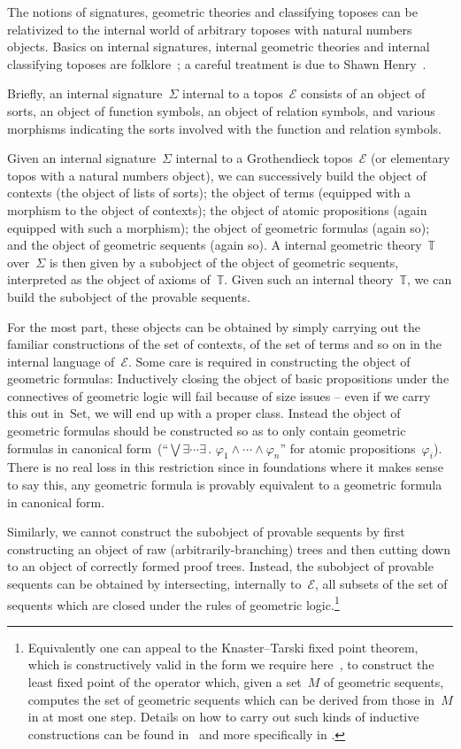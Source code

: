 \documentclass[oneside,reqno]{amsart}
\theoremstyle{definition}
\theoremstyle{plain}
\theoremstyle{remark}
\newcommand{\E}{\mathcal{E}}
\newcommand{\TT}{\mathbb{T}}
\newcommand{\Set}{\mathrm{Set}}
\renewcommand{\_}{\mathpunct{.}\,}
\newcommand{\?}{\,{:}\,}
\begin{document}
The notions of signatures, geometric theories and classifying toposes can be
relativized to the internal world of arbitrary toposes with natural numbers
objects. Basics on internal signatures, internal geometric
theories and internal classifying toposes are
folklore~\cite[p.~334]{wraith:intuitionistic-algebra}; a careful treatment is
due to Shawn Henry~\cite{henry:phd}.

Briefly, an internal signature~$\Sigma$ internal to a topos~$\E$ consists of an
object of sorts, an object of function symbols, an object of relation symbols,
and various morphisms indicating the sorts involved with the function and
relation symbols.

Given an internal signature~$\Sigma$ internal to a Grothendieck topos~$\E$ (or
elementary topos with a natural numbers object), we can successively build the
object of contexts (the object of lists of sorts); the object of terms
(equipped with a morphism to the object of contexts); the object of atomic
propositions (again equipped with such a morphism); the object of geometric
formulas (again so); and the object of geometric sequents (again so). A internal
geometric theory~$\TT$ over~$\Sigma$ is then given by a subobject of the object
of geometric sequents, interpreted as the object of axioms of~$\TT$.
Given such an internal theory~$\TT$, we can build the subobject of the provable
sequents.

For the most part, these objects can be obtained by simply carrying out the
familiar constructions of the set of contexts, of the set of terms and so on in
the internal language of~$\E$. Some care is required in constructing the
object of geometric formulas: Inductively closing the object of basic
propositions under the connectives of geometric logic will fail because of size
issues -- even if we carry this out in~$\Set$, we will end up with a proper
class. Instead the object of geometric formulas should be constructed so as to
only contain geometric formulas in canonical form~(``$\bigvee \exists \cdots
\exists\_ \varphi_1 \wedge \cdots \wedge \varphi_n$'' for atomic
propositions~$\varphi_i$). There is no real loss in this restriction since in
foundations where it makes sense to say this, any geometric formula is provably
equivalent to a geometric formula in canonical form.

Similarly, we cannot construct the subobject of provable sequents by first
constructing an object of raw (arbitrarily-branching) trees and then cutting
down to an object of correctly formed proof trees. Instead, the subobject of
provable sequents can be obtained by intersecting, internally to~$\E$, all
subsets of the set of sequents which are closed under the rules of geometric
logic.\footnote{Equivalently one can appeal to the Knaster--Tarski fixed point
theorem, which is constructively valid in the form we require
here~\cite{bauer-lumsdaine:bourbaki-witt}, to construct the least fixed point
of the operator which, given a set~$M$ of geometric sequents, computes the set of
geometric sequents which can be derived from those in~$M$ in at most one step.
Details on how to carry out such kinds of inductive constructions can be found
in~\cite{blass:induction} and more specifically in
\cite[Chapter~III]{henry:phd}.}
\end{document}
